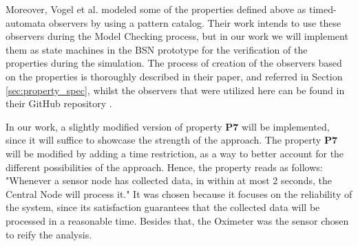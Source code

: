 Moreover, Vogel et al. \cite{vogel2022property} modeled some of the properties defined above as timed-automata observers by using a pattern catalog. Their work intends to use these observers during the Model Checking process, but in our work we will implement them as state machines in the BSN prototype for the verification of the properties during the simulation. The process of creation of the observers based on the properties is thoroughly described in their paper, and referred in Section \ref{sec:property_spec}, whilst the observers that were utilized here can be found in their GitHub repository \cite{2022PSP}.

In our work, a slightly modified version of property \textbf{P7} will be implemented, since it will suffice to showcase the strength of the approach. The property \textbf{P7} will be modified by adding a time restriction, as a way to better account for the different possibilities of the approach. Hence, the property reads as follows: "Whenever a sensor node has collected data, in within at most 2 seconds, the Central Node will process it." It was chosen because it focuses on the reliability of the system, since its satisfaction guarantees that the collected data will be processed in a reasonable time. Besides that, the Oximeter was the sensor chosen to reify the analysis. 